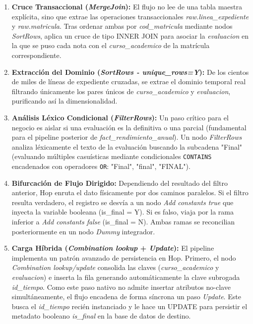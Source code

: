 \begin{enumerate}
    \item \textbf{Cruce Transaccional (\textit{MergeJoin}):} El flujo no lee de una tabla maestra explícita, sino que extrae las operaciones transaccionales \textit{raw.linea\_expediente} y \textit{raw.matricula}. Tras ordenar ambas por \textit{cod\_matricula} mediante nodos \textit{SortRows}, aplica un cruce de tipo INNER JOIN para asociar la \textit{evaluacion} en la que se puso cada nota con el \textit{curso\_academico} de la matrícula correspondiente.
    \item \textbf{Extracción del Dominio (\textit{SortRows - unique\_rows=Y}):} De los cientos de miles de líneas de expediente cruzadas, se extrae el dominio temporal real filtrando únicamente los pares únicos de \textit{curso\_academico} y \textit{evaluacion}, purificando así la dimensionalidad.
    \item \textbf{Análisis Léxico Condicional (\textit{FilterRows}):} Un paso crítico para el negocio es aislar si una evaluación es la definitiva o una parcial (fundamental para el pipeline posterior de \textit{fact\_rendimiento\_anual}). Un nodo \textit{FilterRows} analiza léxicamente el texto de la evaluación buscando la subcadena "Final" (evaluando múltiples casuísticas mediante condicionales \texttt{CONTAINS} encadenados con operadores \texttt{OR}: "Final", "final", "FINAL").
    \item \textbf{Bifurcación de Flujo Dirigido:} Dependiendo del resultado del filtro anterior, Hop enruta el dato físicamente por dos caminos paralelos. Si el filtro resulta verdadero, el registro se desvía a un nodo \textit{Add constants true} que inyecta la variable booleana (is\_final = Y). Si es falso, viaja por la rama inferior a \textit{Add constants false} (is\_final = N). Ambas ramas se reconcilian posteriormente en un nodo \textit{Dummy} integrador.
    \item \textbf{Carga Híbrida (\textit{Combination lookup} + \textit{Update}):} El pipeline implementa un patrón avanzado de persistencia en Hop. Primero, el nodo \textit{Combination lookup/update} consolida las claves (\textit{curso\_academico} y \textit{evaluacion}) e inserta la fila generando automáticamente la clave subrogada \textit{id\_tiempo}. Como este paso nativo no admite insertar atributos no-clave simultáneamente, el flujo encadena de forma síncrona un paso \textit{Update}. Este busca el \textit{id\_tiempo} recién instanciado y le hace un UPDATE para persistir el metadato booleano \textit{is\_final} en la base de datos de destino.
\end{enumerate}

